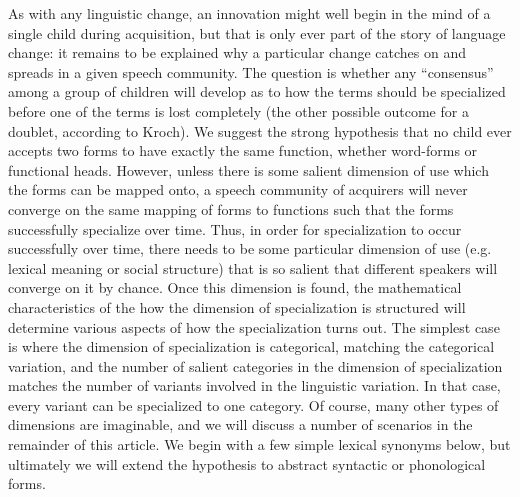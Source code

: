 As with any linguistic change, an innovation might well begin in the mind of a single child during acquisition, but that is only ever part of the story of language change: it remains to be explained why a particular change catches on and spreads in a given speech community.
The question is whether any ``consensus'' among a group of children will develop as to how the terms should be specialized before one of the terms is lost completely (the other possible outcome for a doublet, according to Kroch).
We suggest the strong hypothesis that no child ever accepts two forms to have exactly the same function, whether word-forms or functional heads.
However, unless there is some salient dimension of use which the forms can be mapped onto, a speech community of acquirers will never converge on the same mapping of forms to functions such that the forms successfully specialize over time.
Thus, in order for specialization to occur successfully over time, there needs to be some particular dimension of use (e.g. lexical meaning or social structure) that is so salient that different speakers will converge on it by chance.
Once this dimension is found, the mathematical characteristics of the how the dimension of specialization is structured will determine various aspects of how the specialization turns out.
The simplest case is where the dimension of specialization is categorical, matching the categorical variation, and the number of salient categories in the dimension of specialization matches the number of variants involved in the linguistic variation. 
In that case, every variant can be specialized to one category.
Of course, many other types of dimensions are imaginable, and we will discuss a number of scenarios in the remainder of this article.
We begin with a few simple lexical synonyms below, but ultimately we will extend the hypothesis to abstract syntactic or phonological forms.





